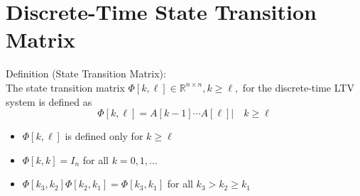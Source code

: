 \documentclass[10pt,a4paper,oneside]{article}
\begin{document}
\section{Discrete-Time State Transition Matrix}
Definition (State Transition Matrix):\\
The state transition matrix $\Phi[k, \ell] \in \mathbb{R}^{n \times n}, k \geq \ell,$ for the discrete-time LTV system is defined as
\[
\Phi[k, \ell]=A[k-1] \cdots A[\ell]| \quad k \geq \ell
\]
\begin{itemize}
\item $\Phi[k, \ell]$ is defined only for $k \geq \ell$
\item $\Phi[k, k]=I_{n}$ for all $k=0,1, \ldots$
\item $\Phi\left[k_{3}, k_{2}\right] \Phi\left[k_{2}, k_{1}\right]=\Phi\left[k_{3}, k_{1}\right]$ for all $k_{3}>k_{2} \geq k_{1}$
\end{itemize}
\end{document}
